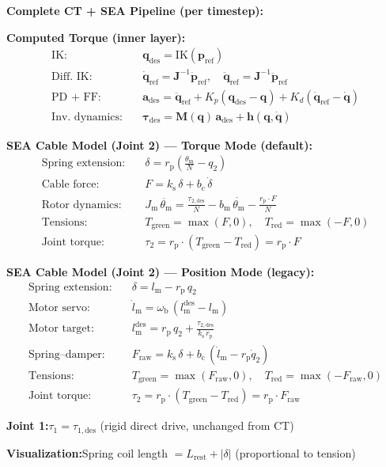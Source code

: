 \documentclass[11pt,a4paper]{article}
\newcommand{\rp}{r_{\mathrm{p}}}
\newcommand{\bq}{\bm{q}}
\newcommand{\btau}{\bm{\tau}}
\newcommand{\bM}{\bm{M}}
\newcommand{\bh}{\bm{h}}
\newcommand{\bJ}{\bm{J}}
\newcommand{\lm}{l_{\mathrm{m}}}
\newcommand{\lmd}{\dot{l}_{\mathrm{m}}}
\newcommand{\ks}{k_{\mathrm{s}}}
\newcommand{\bc}{b_{\mathrm{c}}}
\newcommand{\wb}{\omega_{\mathrm{b}}}
\newcommand{\Jm}{J_{\mathrm{m}}}
\newcommand{\thetam}{\theta_{\mathrm{m}}}
\begin{document}
\begin{resultbox}
\textbf{Complete CT + SEA Pipeline (per timestep):}

\medskip
\textbf{Computed Torque (inner layer):}
\begin{align}
    \text{IK:}\quad
        & \bq_{\mathrm{des}} = \mathrm{IK}(\bm{p}_{\mathrm{ref}}) \\[4pt]
    \text{Diff.\ IK:}\quad
        & \dot{\bq}_{\mathrm{ref}} = \bJ^{-1} \dot{\bm{p}}_{\mathrm{ref}}, \quad
          \ddot{\bq}_{\mathrm{ref}} = \bJ^{-1} \ddot{\bm{p}}_{\mathrm{ref}} \\[4pt]
    \text{PD + FF:}\quad
        & \bm{a}_{\mathrm{des}} = \ddot{\bq}_{\mathrm{ref}} + K_p(\bq_{\mathrm{des}} - \bq) + K_d(\dot{\bq}_{\mathrm{ref}} - \dot{\bq}) \\[4pt]
    \text{Inv.\ dynamics:}\quad
        & \btau_{\mathrm{des}} = \bM(\bq)\,\bm{a}_{\mathrm{des}} + \bh(\bq, \dot{\bq})
\end{align}

\medskip
\textbf{SEA Cable Model (Joint 2) --- Torque Mode (default):}
\begin{align}
    \text{Spring extension:}\quad
        & \delta = \rp \!\left(\frac{\thetam}{N} - q_2\right) \\[4pt]
    \text{Cable force:}\quad
        & F = \ks \, \delta + \bc \, \dot{\delta} \\[4pt]
    \text{Rotor dynamics:}\quad
        & \Jm \, \ddot{\thetam} = \frac{\tau_{2,\mathrm{des}}}{N} - b_{\mathrm{m}} \, \dot{\thetam} - \frac{\rp \cdot F}{N} \\[4pt]
    \text{Tensions:}\quad
        & T_{\mathrm{green}} = \max(F, 0), \quad
          T_{\mathrm{red}} = \max(-F, 0) \\[4pt]
    \text{Joint torque:}\quad
        & \tau_2 = \rp \cdot (T_{\mathrm{green}} - T_{\mathrm{red}})
          = \rp \cdot F
\end{align}

\medskip
\textbf{SEA Cable Model (Joint 2) --- Position Mode (legacy):}
\begin{align}
    \text{Spring extension:}\quad
        & \delta = \lm - \rp \, q_2 \\[4pt]
    \text{Motor servo:}\quad
        & \lmd = \wb \, (\lm^{\mathrm{des}} - \lm) \\[4pt]
    \text{Motor target:}\quad
        & \lm^{\mathrm{des}} = \rp \, q_2 + \frac{\tau_{2,\mathrm{des}}}{\ks \, \rp} \\[4pt]
    \text{Spring--damper:}\quad
        & F_{\mathrm{raw}} = \ks \, \delta + \bc \, (\lmd - \rp \dot{q}_2) \\[4pt]
    \text{Tensions:}\quad
        & T_{\mathrm{green}} = \max(F_{\mathrm{raw}}, 0), \quad
          T_{\mathrm{red}} = \max(-F_{\mathrm{raw}}, 0) \\[4pt]
    \text{Joint torque:}\quad
        & \tau_2 = \rp \cdot (T_{\mathrm{green}} - T_{\mathrm{red}})
          = \rp \cdot F_{\mathrm{raw}}
\end{align}

\textbf{Joint 1:}\quad $\tau_1 = \tau_{1,\mathrm{des}}$ \quad (rigid direct drive, unchanged from CT)

\medskip
\textbf{Visualization:}\quad Spring coil length $= L_{\mathrm{rest}} + |\delta|$ \quad (proportional to tension)
\end{resultbox}
\end{document}
